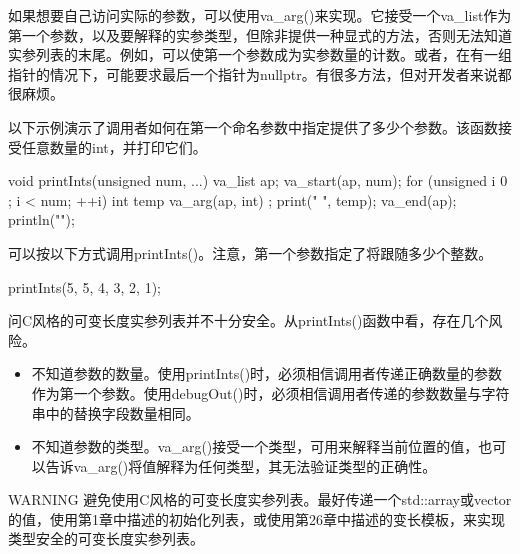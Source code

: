 
如果想要自己访问实际的参数，可以使用va\_arg()来实现。它接受一个va\_list作为第一个参数，以及要解释的实参类型，但除非提供一种显式的方法，否则无法知道实参列表的末尾。例如，可以使第一个参数成为实参数量的计数。或者，在有一组指针的情况下，可能要求最后一个指针为nullptr。有很多方法，但对开发者来说都很麻烦。

以下示例演示了调用者如何在第一个命名参数中指定提供了多少个参数。该函数接受任意数量的int，并打印它们。

\begin{cpp}
void printInts(unsigned num, ...)
{
    va_list ap;
    va_start(ap, num);
    for (unsigned i { 0 }; i < num; ++i) {
        int temp { va_arg(ap, int) };
        print("{} ", temp);
    }
    va_end(ap);
    println("");
}
\end{cpp}

可以按以下方式调用printInts()。注意，第一个参数指定了将跟随多少个整数。

\begin{cpp}
printInts(5, 5, 4, 3, 2, 1);
\end{cpp}


问C风格的可变长度实参列表并不十分安全。从printInts()函数中看，存在几个风险。

\begin{itemize}
\item
不知道参数的数量。使用printInts()时，必须相信调用者传递正确数量的参数作为第一个参数。使用debugOut()时，必须相信调用者传递的参数数量与字符串中的替换字段数量相同。

\item
不知道参数的类型。va\_arg()接受一个类型，可用来解释当前位置的值，也可以告诉va\_arg()将值解释为任何类型，其无法验证类型的正确性。
\end{itemize}

\begin{myWarning}{WARNING}
避免使用C风格的可变长度实参列表。最好传递一个std::array或vector的值，使用第1章中描述的初始化列表，或使用第26章中描述的变长模板，来实现类型安全的可变长度实参列表。
\end{myWarning}













